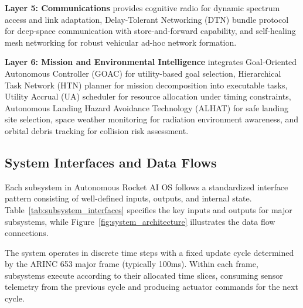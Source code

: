 \documentclass[10pt, conference, compsocconf]{IEEEtran}
\begin{document}
\textbf{Layer 5: Communications} provides cognitive radio for dynamic spectrum access and link adaptation, Delay-Tolerant Networking (DTN) bundle protocol for deep-space communication with store-and-forward capability, and self-healing mesh networking for robust vehicular ad-hoc network formation\cite{arxivmesh}.

\textbf{Layer 6: Mission and Environmental Intelligence} integrates Goal-Oriented Autonomous Controller (GOAC) for utility-based goal selection, Hierarchical Task Network (HTN) planner for mission decomposition into executable tasks\cite{zhang2024spacecraft}, Utility Accrual (UA) scheduler for resource allocation under timing constraints\cite{scienceDirectUA}, Autonomous Landing Hazard Avoidance Technology (ALHAT) for safe landing site selection\cite{nasaalhat}, space weather monitoring for radiation environment awareness\cite{michigantoday}, and orbital debris tracking for collision risk assessment\cite{sciencetimes}.

\subsection{System Interfaces and Data Flows}

Each subsystem in Autonomous Rocket AI OS follows a standardized interface pattern consisting of well-defined inputs, outputs, and internal state. Table~\ref{tab:subsystem_interfaces} specifies the key inputs and outputs for major subsystems, while Figure~\ref{fig:system_architecture} illustrates the data flow connections.

The system operates in discrete time steps with a fixed update cycle determined by the ARINC 653 major frame (typically 100ms)\cite{arinc653wiki}. Within each frame, subsystems execute according to their allocated time slices, consuming sensor telemetry from the previous cycle and producing actuator commands for the next cycle.
\end{document}
